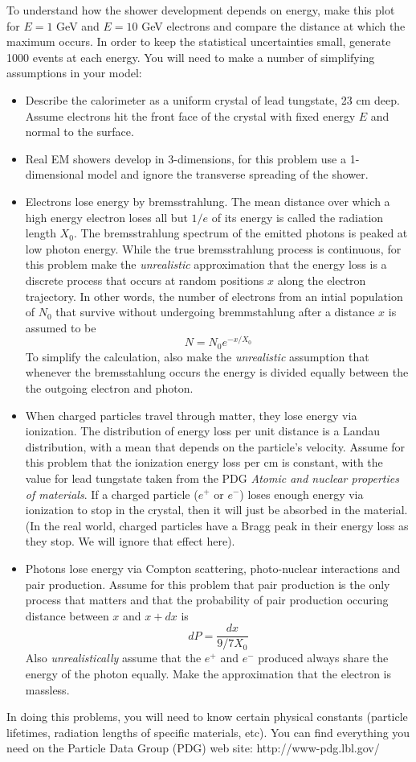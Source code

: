 \documentclass[12pt]{article}
\begin{document}
\noindent
To understand how the shower development depends on energy, make
this plot for $E=1$ GeV and $E=10$ GeV electrons and compare
the distance at which the maximum occurs. 
In order to keep the statistical
uncertainties small, generate 1000 events at each energy.
\newpage
You will need to make a 
number of simplifying assumptions in your model: 
\begin{itemize}
\item Describe the calorimeter as a uniform  crystal of lead tungstate, 23
cm deep.  Assume electrons hit the front face of the crystal with 
fixed energy
$E$ and normal to the surface.
\item Real EM showers develop in 3-dimensions, for this problem use a 1-dimensional
model and ignore the transverse spreading of the shower.
\item Electrons lose energy by bremsstrahlung.  The mean distance
over which a high energy electron loses all but $1/e$ of its energy is
called the radiation length $X_0$.
The bremsstrahlung spectrum of
the emitted photons is peaked at low photon energy. 
While the true bremsstrahlung process is continuous, for this problem
make the {\it unrealistic} approximation that the energy loss is a discrete process
that occurs at random positions $x$ along the electron trajectory.
In other words, the number of electrons from an intial population of
$N_0$ that survive without undergoing bremmstahlung
after a distance $x$ is assumed to be 
$$
N = N_0 e^{-x/X_0}
$$
To simplify the calculation, also make the {\it unrealistic} assumption
that whenever the bremsstahlung occurs the energy is divided equally
between the the outgoing electron and photon.
\item When charged particles travel through matter, they lose energy 
via ionization.
The distribution of energy loss per unit distance is a Landau distribution,
with a mean that depends on the particle's velocity.
Assume for this problem
that the ionization energy loss per cm is constant, with
the value for lead tungstate
taken from the PDG {\it Atomic and nuclear properties of materials}.
If a charged particle ($e^+$ or $e^-$) loses enough energy via 
ionization to stop in the crystal, then it will just
be absorbed in the material. (In the real world, charged particles
have a Bragg peak in their energy loss as they stop. We will ignore
that effect here).
\item  Photons lose energy via Compton scattering, photo-nuclear 
interactions and pair production.  Assume for this problem
that pair production is
the only process that matters and that the probability of pair
production occuring distance between $x$  and $x+dx$ is
$$dP = \frac{dx}{9/7 X_0}$$
Also
{\it unrealistically} assume that the $e^+$ and $e^-$  produced 
always share the
energy of the photon equally.  Make the approximation that  the electron is massless.\\
\end{itemize}
In doing this problems, you will need to know certain physical constants (particle lifetimes,
radiation lengths of specific materials, etc).  You can find everything
you need on the Particle Data Group (PDG) web site:
  http://www-pdg.lbl.gov/
\end{document}

